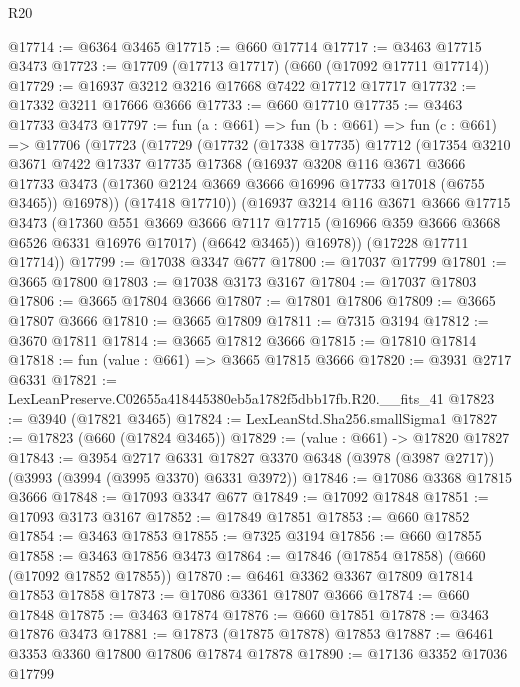 \begin{lexlean}{R20}
\begin{coremodule}
@17714 := @6364 @3465
@17715 := @660 @17714
@17717 := @3463 @17715 @3473
@17723 := @17709 (@17713 @17717) (@660 (@17092 @17711 @17714))
@17729 := @16937 @3212 @3216 @17668 @7422 @17712 @17717
@17732 := @17332 @3211 @17666 @3666
@17733 := @660 @17710
@17735 := @3463 @17733 @3473
@17797 := fun (a : @661) =>
  fun (b : @661) =>
  fun (c : @661) =>
  @17706
    (@17723
      (@17729
        (@17732
          (@17338 @17735)
          @17712
          (@17354
            @3210
            @3671
            @7422
            @17337
            @17735
            @17368
            (@16937
              @3208
              @116
              @3671
              @3666
              @17733
              @3473
              (@17360 @2124 @3669 @3666 @16996 @17733 @17018 (@6755 @3465))
              @16978))
          (@17418 @17710))
        (@16937
          @3214
          @116
          @3671
          @3666
          @17715
          @3473
          (@17360
            @551
            @3669
            @3666
            @7117
            @17715
            (@16966 @359 @3666 @3668 @6526 @6331 @16976 @17017)
            (@6642 @3465))
          @16978))
      (@17228 @17711 @17714))
@17799 := @17038 @3347 @677
@17800 := @17037 @17799
@17801 := @3665 @17800
@17803 := @17038 @3173 @3167
@17804 := @17037 @17803
@17806 := @3665 @17804 @3666
@17807 := @17801 @17806
@17809 := @3665 @17807 @3666
@17810 := @3665 @17809
@17811 := @7315 @3194
@17812 := @3670 @17811
@17814 := @3665 @17812 @3666
@17815 := @17810 @17814
@17818 := fun (value : @661) => @3665 @17815 @3666
@17820 := @3931 @2717 @6331
@17821 := LexLeanPreserve.C02655a418445380eb5a1782f5dbb17fb.R20.__fits_41
@17823 := @3940 (@17821 @3465)
@17824 := LexLeanStd.Sha256.smallSigma1
@17827 := @17823 (@660 (@17824 @3465))
@17829 := (value : @661) -> @17820 @17827
@17843 := @3954
    @2717
    @6331
    @17827
    @3370
    @6348
    (@3978 (@3987 @2717))
    (@3993 (@3994 (@3995 @3370) @6331 @3972))
@17846 := @17086 @3368 @17815 @3666
@17848 := @17093 @3347 @677
@17849 := @17092 @17848
@17851 := @17093 @3173 @3167
@17852 := @17849 @17851
@17853 := @660 @17852
@17854 := @3463 @17853
@17855 := @7325 @3194
@17856 := @660 @17855
@17858 := @3463 @17856 @3473
@17864 := @17846 (@17854 @17858) (@660 (@17092 @17852 @17855))
@17870 := @6461 @3362 @3367 @17809 @17814 @17853 @17858
@17873 := @17086 @3361 @17807 @3666
@17874 := @660 @17848
@17875 := @3463 @17874
@17876 := @660 @17851
@17878 := @3463 @17876 @3473
@17881 := @17873 (@17875 @17878) @17853
@17887 := @6461 @3353 @3360 @17800 @17806 @17874 @17878
@17890 := @17136 @3352 @17036 @17799

\end{coremodule}
\end{lexlean}
